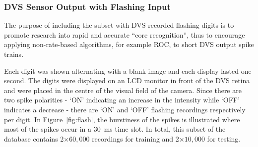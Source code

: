 %
%
%
%


\subsubsection{DVS Sensor Output with Flashing Input}
\label{subsec_flash}
The purpose of including the subset with DVS-recorded flashing digits is to promote research into rapid and accurate ``core recognition'', thus to encourage applying non-rate-based algorithms, for example ROC, to short DVS output spike trains.

Each digit was shown alternating with a blank image and each display lasted one second.
The digits were displayed on an LCD monitor in front of the DVS retina~\cite{serrano2013128} and were placed in the centre of the visual field of the camera.
Since there are two spike polarities - `ON' indicating an increase in the intensity while `OFF' indicates a decrease - there are `ON' and `OFF' flashing recordings respectively per digit.
In Figure~\ref{fig:flash}, the burstiness of the spikes is illustrated where most of the spikes occur in a 30~ms time slot. 
In total, this subset of the database contains 2$\times$$60,000$ recordings for training and 2$\times$$10,000$ for testing.

